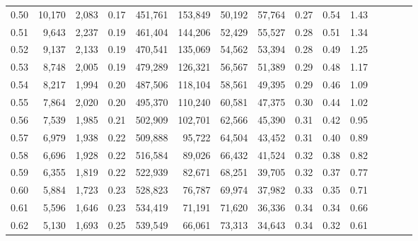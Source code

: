 \begin{tabular}{rrrcrrrrrrrrrrr}
0.50 &  10,170 &  2,083 &                                       0.17 &  451,761 &  153,849 &   50,192 &   57,764 &  0.27 &  0.54 &                         1.43 \\
0.51 &   9,643 &  2,237 &                                       0.19 &  461,404 &  144,206 &   52,429 &   55,527 &  0.28 &  0.51 &                         1.34 \\
0.52 &   9,137 &  2,133 &                                       0.19 &  470,541 &  135,069 &   54,562 &   53,394 &  0.28 &  0.49 &                         1.25 \\
0.53 &   8,748 &  2,005 &                                       0.19 &  479,289 &  126,321 &   56,567 &   51,389 &  0.29 &  0.48 &                         1.17 \\
0.54 &   8,217 &  1,994 &                                       0.20 &  487,506 &  118,104 &   58,561 &   49,395 &  0.29 &  0.46 &                         1.09 \\
0.55 &   7,864 &  2,020 &                                       0.20 &  495,370 &  110,240 &   60,581 &   47,375 &  0.30 &  0.44 &                         1.02 \\
0.56 &   7,539 &  1,985 &                                       0.21 &  502,909 &  102,701 &   62,566 &   45,390 &  0.31 &  0.42 &                         0.95 \\
0.57 &   6,979 &  1,938 &                                       0.22 &  509,888 &   95,722 &   64,504 &   43,452 &  0.31 &  0.40 &                         0.89 \\
0.58 &   6,696 &  1,928 &                                       0.22 &  516,584 &   89,026 &   66,432 &   41,524 &  0.32 &  0.38 &                         0.82 \\
0.59 &   6,355 &  1,819 &                                       0.22 &  522,939 &   82,671 &   68,251 &   39,705 &  0.32 &  0.37 &                         0.77 \\
0.60 &   5,884 &  1,723 &                                       0.23 &  528,823 &   76,787 &   69,974 &   37,982 &  0.33 &  0.35 &                         0.71 \\
0.61 &   5,596 &  1,646 &                                       0.23 &  534,419 &   71,191 &   71,620 &   36,336 &  0.34 &  0.34 &                         0.66 \\
0.62 &   5,130 &  1,693 &                                       0.25 &  539,549 &   66,061 &   73,313 &   34,643 &  0.34 &  0.32 &                         0.61 \\

\end{tabular}
